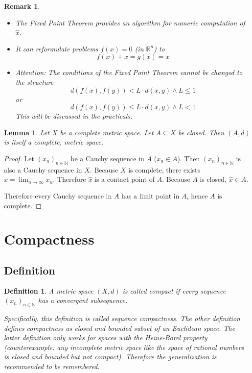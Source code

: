 \documentclass{article}
\newtheorem{definition}{Definition}  \numberwithin{definition}{section}
\newtheorem{lemma}{Lemma}  \numberwithin{lemma}{section}
\newtheorem{remark}{Remark}  \numberwithin{remark}{section}
\begin{document}
\begin{remark}
  \begin{itemize}
  	\item The Fixed Point Theorem provides an algorithm for numeric computation of $\hat{x}$.
    \item It can reformulate problems $f(x) = 0$ (in $\mathbb R^n$) to
      \[ f(x) + x = g(x) = x \]
    \item Attention: The conditions of the Fixed Point Theorem cannot be changed to the structure
      \[ d(f(x), f(y)) < L \cdot d(x, y) \land L \leq 1 \]
      or
      \[ d(f(x), f(y)) \leq L \cdot d(x, y) \land L < 1 \]
      This will be discussed in the practicals.
  \end{itemize}
\end{remark}

\begin{lemma} %
  \label{lemma7}
  Let $X$ be a complete metric space. Let $A \subseteq X$ be closed.
  Then $(A, d)$ is itself a complete, metric space.
\end{lemma}

\begin{proof}
  Let $(x_n)_{n \in \mathbb N}$ be a Cauchy sequence in $A$ ($x_n \in A$).
  Then $(x_n)_{n \in \mathbb N}$ is also a Cauchy sequence in $X$.
  Because $X$ is complete, there exists $\hat{x} = \lim_{n\to\infty} x_n$.
  Therefore $\hat{x}$ is a contact point of $A$.
  Because $A$ is closed, $\hat{x} \in A$.

  Therefore every Cauchy sequence in $A$ has a limit point in $A$,
  hence $A$ is complete.
\end{proof}

\section{Compactness}
\subsection{Definition}

\begin{definition} %
  A metric space $(X, d)$ is called \emph{compact} if every sequence $(x_n)_{n \in \mathbb N}$
  has a convergent subsequence.

  Specifically, this definition is called sequence compactness. The other definition defines compactness as closed and bounded subset of an Euclidean space. The latter definition only works for \emph{spaces with the Heine-Borel property} (counterexample: any incomplete metric space like the space of rational numbers is closed and bounded but not compact). Therefore the generalization is recommended to be remembered.
\end{definition}
\end{document}

